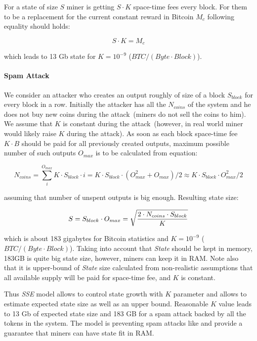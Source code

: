 \documentclass[]{llncs}   %
\newcommand{\esse}{\textit{SSE}}
\newcommand{\state}{\textit{State}}
\begin{document}
For a state of size $S$ miner is getting $S \cdot K$ space-time fees every block. For them to be a replacement for the current constant reward in Bitcoin $M_c$ following equality should holds:

\begin{equation}
\label{eq:statesizeexp}
S \cdot K = M_c
\end{equation}

which leads to 13 Gb state for $K=10^{-9}$ ($BTC / (Byte \cdot Block)$).


\paragraph{Spam Attack}

We consider an attacker who creates an output roughly of size of a block $S_{block}$ for every block in a row. Initially the attacker has all the $N_{coins}$ of the system and he does not buy new coins during the attack~(miners do not sell the coins to him). We assume that $K$ is constant during the attack~(however, in real world miner would likely raise $K$ during the attack). As soon as each block space-time fee $K \cdot B$ should be paid for all previously created outputs, maximum possible number of such outputs $O_{max}$ is to be calculated from equation:

\begin{equation}
N_{coins} = \sum_i^{O_{max}}{K \cdot S_{block} \cdot i} = K \cdot S_{block} \cdot ( O_{max}^2 + O_{max}) / 2 \approx K \cdot S_{block} \cdot O_{max}^2 / 2
\end{equation}

assuming that number of unspent outputs is big enough. Resulting state size: 

\begin{equation}
\label{eq:statesizemax}
S = S_{block} \cdot O_{max} = \sqrt { 2 \cdot N_{coins} \cdot S_{block} \over K}
\end{equation}

which is about 183 gigabytes for Bitcoin statistics and $K=10^{-9}$ ($BTC / (Byte \cdot Block)$). Taking into account that \state{} should be kept in memory, 183GB is quite big state size, however, miners can keep it in RAM. Note also that it is upper-bound of \state{} size calculated from non-realistic assumptions that all available supply will be paid for space-time fee, and $K$ is constant.



Thus \esse{} model allows to control state growth with $K$ parameter and allows to estimate expected state size as well as an upper bound. Reasonable $K$ value leads to 13 Gb of expected state size and 183 GB for a spam attack backed by all the tokens in the system. The model is preventing spam attacks like \cite{bitcoin2015flood} and provide a guarantee that miners can have state fit in RAM.
\end{document}
